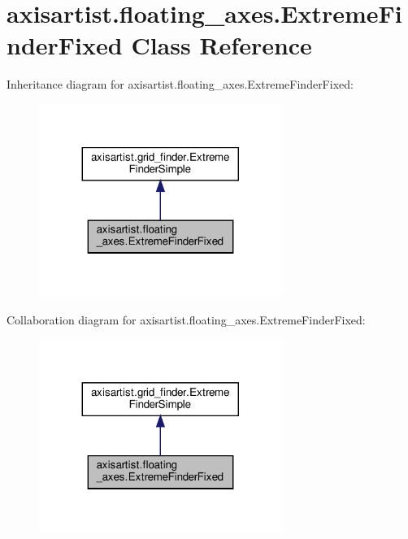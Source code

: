 \hypertarget{classaxisartist_1_1floating__axes_1_1ExtremeFinderFixed}{}\section{axisartist.\+floating\+\_\+axes.\+Extreme\+Finder\+Fixed Class Reference}
\label{classaxisartist_1_1floating__axes_1_1ExtremeFinderFixed}


Inheritance diagram for axisartist.\+floating\+\_\+axes.\+Extreme\+Finder\+Fixed\+:
\nopagebreak
\begin{figure}[H]
\begin{center}
\leavevmode
\includegraphics[width=224pt]{classaxisartist_1_1floating__axes_1_1ExtremeFinderFixed__inherit__graph}
\end{center}
\end{figure}


Collaboration diagram for axisartist.\+floating\+\_\+axes.\+Extreme\+Finder\+Fixed\+:
\nopagebreak
\begin{figure}[H]
\begin{center}
\leavevmode
\includegraphics[width=224pt]{classaxisartist_1_1floating__axes_1_1ExtremeFinderFixed__coll__graph}
\end{center}
\end{figure}
